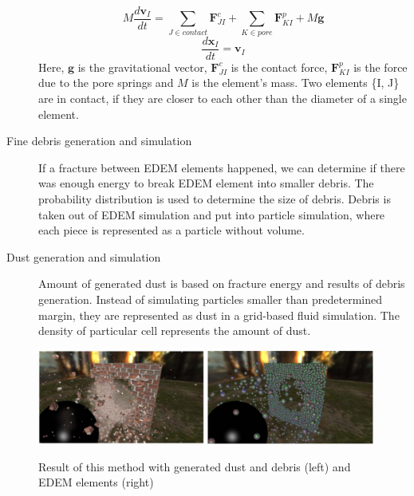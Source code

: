 \begin{description}
\[M\frac{d\mathbf{v}_I}{dt} = \sum_{J \in contact}^{} \mathbf{F}_{JI}^c + \sum_{K \in pore}^{} \mathbf{F}_{KI}^p + M\mathbf{g} \]
\[ \frac{d\mathbf{x}_I}{dt} = \mathbf{v}_I \]
Here, $\mathbf{g}$ is the gravitational vector, $\mathbf{F}^c_{JI}$ is the contact force, $\mathbf{F}^p_{KI}$ is the force due to the pore springs and $\mathit{M}$ is the element’s mass. Two elements \{I, J\} are in contact, if they are closer to each other than the diameter of a single element.

\item[Fine debris generation and simulation] If a fracture between EDEM elements happened, we can determine if there was enough energy to break EDEM element into smaller debris. The probability distribution is used to determine the size of debris. Debris is taken out of EDEM simulation and put into particle simulation, where each piece is represented as a particle without volume.

\item[Dust generation and simulation] Amount of generated dust is based on fracture energy and results of debris generation. Instead of simulating particles smaller than predetermined margin, they are represented as dust in a grid-based fluid simulation. The density of particular cell represents the amount of dust.

\end{description}

 \begin{figure}
        \centering
        \includegraphics[width=0.49\textwidth]{img/edem_real}
        \includegraphics[width=0.49\textwidth]{img/edem}
        \caption{Result of this method with generated dust and debris (left) and EDEM elements (right) \cite{edem}}
        \label{fig:edem}
    \end{figure}
   
